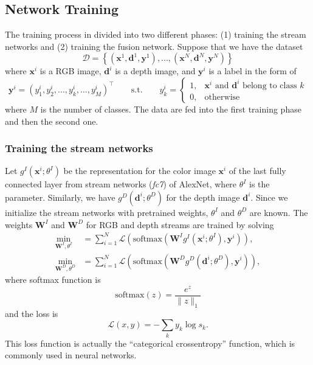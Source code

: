 \subsection{Network Training}
The training process in divided into two different phases: (1) training the stream networks and (2) training the fusion network. Suppose that we have the dataset
\begin{equation}
	\mathcal{D} = \left\{ \left(\mathbf{x}^1, \mathbf{d}^1, \mathbf{y}^1\right), ..., \left(\mathbf{x}^N, \mathbf{d}^N, \mathbf{y}^N\right) \right\}
\end{equation}
where $\mathbf{x}^i$ is a RGB image, $\mathbf{d}^i$ is a depth image, and $\mathbf{y}^i$ is a label in the form of
\begin{equation}
	\label{equ:label}
	\mathbf{y}^i = (y_1^i, y_2^i, ..., y_k^i, ..., y_{M}^i)^\top \qquad \text{s.t.} \qquad y_k^i = 
	\begin{cases}
	1, & \mathbf{x}^i \text{ and } \mathbf{d}^i \text{ belong to class } k\\
	0, & \text{otherwise}
	\end{cases}
\end{equation}
where $M$ is the number of classes. The data are fed into the first training phase and then the second one.

\subsubsection{Training the stream networks}
Let $g^I(\mathbf{x}^i; \theta^I)$ be the representation for the color image $\mathbf{x}^i$ of the last fully connected layer from stream networks (\textit{fc7}) of AlexNet, where $\theta^I$ is the parameter. Similarly, we have $g^D(\mathbf{d}^i; \theta^D)$ for the depth image $\mathbf{d}^i$. Since we initialize the stream networks with pretrained weights, $\theta^I$ and $\theta^D$ are known. The weights $\mathbf{W}^I$ and $\mathbf{W}^D$ for RGB and depth streams are trained by solving
\begin{align}
	\min_{\mathbf{W}^I,\theta^I} &= \sum_{i=1}^N \mathcal{L} \left( \text{softmax}\left(\mathbf{W}^I g^I \left(\mathbf{x}^i; \theta^I\right), \mathbf{y}^i\right)\right), \\
	\min_{\mathbf{W}^D,\theta^D} &= \sum_{i=1}^N \mathcal{L} \left( \text{softmax}\left(\mathbf{W}^D g^D \left(\mathbf{d}^i; \theta^D\right), \mathbf{y}^i\right)\right),
\end{align}
where softmax function is
\begin{equation}
	\text{softmax}(z) =\frac{e^z}{\lVert z \rVert_1}
\end{equation}
and the loss is
\begin{equation}
	\mathcal{L}(x,y) = -\sum_k y_k \log s_k.
\end{equation}
This loss function is actually the ``categorical crossentropy'' function, which is commonly used in neural networks.

